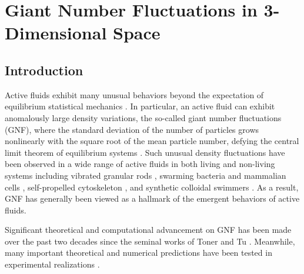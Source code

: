 \chapter[Giant Number Fluctuations in 3-Dimensional Space]{Giant Number Fluctuations in 3-Dimensional Space}
\label{giant-number-fluctuations-in-3-dimensional-space}

\section{Introduction}
Active fluids exhibit many unusual behaviors beyond the expectation of equilibrium statistical mechanics \cite{Ramaswamy2010,Cates2012,Marchetti2013,Poon2013,Elgeti2015}.
In particular, an active fluid can exhibit anomalously large density variations, the so-called giant number fluctuations (GNF), where the standard deviation of the number of particles grows nonlinearly with the square root of the mean particle number, defying the central limit theorem of equilibrium systems \cite{Mishin2015}.
Such unusual density fluctuations have been observed in a wide range of active fluids in both living and non-living systems including vibrated granular rods \cite{Narayan2007,Aranson2008,Kudrolli2008,Deseigne2010},
swarming bacteria \cite{Zhang2010,Nishiguchi2017} and mammalian cells \cite{Kawaguchi2017},
self-propelled cytoskeleton \cite{Schaller2013}, and synthetic colloidal swimmers \cite{Palacci2013,Karani2019}. As a result, GNF has generally been viewed as a hallmark of the emergent behaviors of active fluids.


Significant theoretical and computational advancement on GNF has been made over the past two decades since the seminal works of Toner and Tu \cite{Toner1995,Tu1998,Toner1998,Simha2002,Ramaswamy2003,Toner2005,Chate2008,Mishra2010,
Dey2012,Saintillan2012,Saintillan2013,Ngo2014,Mahault2019}. Meanwhile, many important theoretical and numerical predictions have been tested in experimental realizations
\cite{Narayan2007, Aranson2008, Deseigne2010, Zhang2010, Schaller2013,
Nishiguchi2017, Kawaguchi2017, Palacci2013}.

